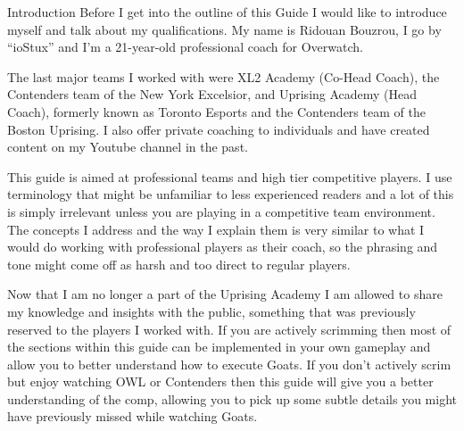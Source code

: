 
Introduction
Before I get into the outline of this Guide I would like to introduce myself and talk about my qualifications. My name is Ridouan Bouzrou, I go by “ioStux” and I’m a 21-year-old professional coach for Overwatch.

The last major teams I worked with were XL2 Academy (Co-Head Coach), the Contenders team of the New York Excelsior, and Uprising Academy (Head Coach), formerly known as Toronto Esports and the Contenders team of the Boston Uprising. I also offer private coaching to individuals and have created content on my Youtube channel in the past.  

This guide is aimed at professional teams and high tier competitive players. I use terminology that might be unfamiliar to less experienced readers and a lot of this is simply irrelevant unless you are playing in a competitive team environment. The concepts I address and the way I explain them is very similar to what I would do working with professional players as their coach, so the phrasing and tone might come off as harsh and too direct to regular players.

Now that I am no longer a part of the Uprising Academy I am allowed to share my knowledge and insights with the public, something that was previously reserved to the players I worked with. If you are actively scrimming then most of the sections within this guide can be implemented in your own gameplay and allow you to better understand how to execute Goats. If you don’t actively scrim but enjoy watching OWL or Contenders then this guide will give you a better understanding of the comp, allowing you to pick up some subtle details you might have previously missed while watching Goats.

